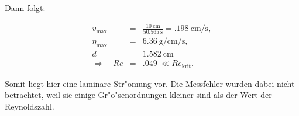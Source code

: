 		Dann folgt:

		\begin{eqnarray*}
			v_\mathrm{max} & = & \frac{\SI{10}{\centi \meter}}{\SI{50.565}{\second}} = \SI{.198}{\centi \meter \per \second} , \\
			\eta_\mathrm{max} & = & \SI{6.36}{\gram \per \centi \meter \per \second} , \\
			d & = & \SI{1.582}{\centi \meter} \\
			\Rightarrow \quad Re & = & \SI{.049}{} \ll Re_\mathrm{krit} .
		\end{eqnarray*}

		Somit liegt hier eine laminare Str"omung vor.
		Die Messfehler wurden dabei nicht be\-trach\-tet, weil sie einige Gr"o"senordnungen kleiner sind als der Wert der Reynoldszahl.
